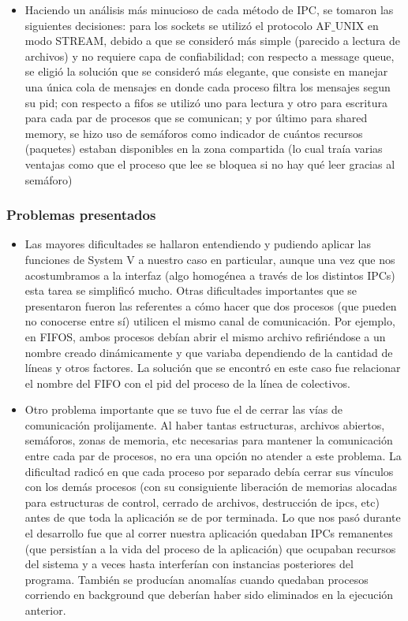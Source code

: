 \documentclass[a4paper,10pt]{elsart}
\begin{document}
\begin{itemize}
	\item Haciendo un an\'alisis m\'as minucioso de cada m\'etodo de IPC, se tomaron las siguientes decisiones: para los sockets se utiliz\'o el protocolo AF$\_$UNIX en modo STREAM, debido a que se consider\'o m\'as simple (parecido a lectura de archivos) y no requiere capa de confiabilidad; con respecto a message queue, se eligi\'o la soluci\'on que se consider\'o m\'as elegante, que consiste en manejar una \'unica cola de mensajes en donde cada proceso filtra los mensajes segun su pid; con respecto a fifos se utiliz\'o uno para lectura y otro para escritura para cada par de procesos que se comunican; y por \'ultimo para shared memory, se hizo uso de sem\'aforos como indicador de cu\'antos recursos (paquetes) estaban disponibles en la zona compartida (lo cual tra\'ia varias ventajas como que el proceso que lee se bloquea si no hay qu\'e leer gracias al sem\'aforo)
\end{itemize}


\subsubsection{Problemas presentados}
\begin{itemize}
	\item Las mayores dificultades se hallaron entendiendo y pudiendo aplicar las funciones de System V a nuestro caso en particular, aunque una vez que nos acostumbramos a la interfaz (algo homog\'enea a trav\'es de los distintos IPCs) esta tarea se simplific\'o mucho. Otras dificultades importantes que se presentaron fueron las referentes a c\'omo hacer que dos procesos (que pueden no conocerse entre s\'i) utilicen el mismo canal de comunicaci\'on. Por ejemplo, en FIFOS, ambos procesos deb\'ian abrir el mismo archivo refiri\'endose a un nombre creado din\'amicamente y que variaba dependiendo de la cantidad de l\'ineas y otros factores. La soluci\'on que se encontr\'o en este caso fue relacionar el nombre del FIFO con el pid del proceso de la l\'inea de colectivos.
	\item Otro problema importante que se tuvo fue el de cerrar las v\'ias de comunicaci\'on prolijamente. Al haber tantas estructuras, archivos abiertos, sem\'aforos, zonas de memoria, etc necesarias para mantener la comunicaci\'on entre cada par de procesos, no era una opci\'on no atender a este problema. La dificultad radic\'o en que cada proceso por separado deb\'ia cerrar sus v\'inculos con los dem\'as procesos (con su consiguiente liberaci\'on de memorias alocadas para estructuras de control, cerrado de archivos, destrucci\'on de ipcs, etc) antes de que toda la aplicaci\'on se de por terminada. Lo que nos pas\'o durante el desarrollo fue que al correr nuestra aplicaci\'on quedaban IPCs remanentes (que persist\'ian a la vida del proceso de la aplicaci\'on) que ocupaban recursos del sistema y a veces hasta interfer\'ian con instancias posteriores del programa. Tambi\'en se produc\'ian anomal\'ias cuando quedaban procesos corriendo en background que deber\'ian haber sido eliminados en la ejecuci\'on anterior.
\end{itemize}
\end{document}
